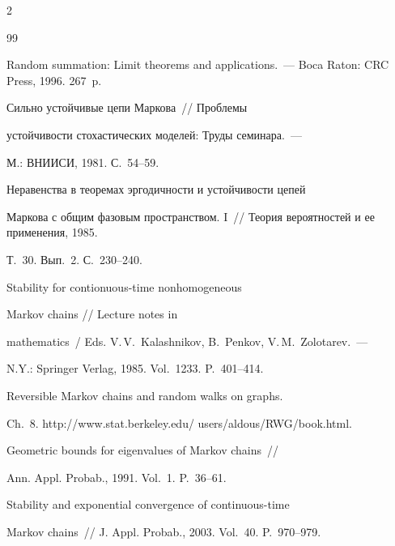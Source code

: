 \begin{multicols}{2}
{{\begin{thebibliography}{99}


Random summation: Limit theorems and applications.~--- Boca Raton: CRC Press, 1996. 267~p.




 Сильно устойчивые цепи Маркова~// Проб\-ле\-мы

устой\-чи\-вости сто\-ха\-сти\-че\-ских моделей: Труды семинара.~---

М.: ВНИИСИ, 1981. С.~54--59.




 Неравенства в теоремах эргодич\-ности и устойчивости цепей

Маркова с общим фазовым пространством. I~// Теория вероятностей и ее применения, 1985.

Т.~30. Вып.~2. С.~230--240.




  Stability for contionuous-time nonhomogeneous 

Markov chains //  Lecture notes in

mathematics~/ Eds. V.\,V.~Kalashnikov, B.~Penkov, V.\,M.~Zolotarev.~---

N.Y.: Springer Verlag,  1985. Vol.~1233. P.~401--414.




 Reversible Markov chains and random walks on graphs.

Ch.~8. {\sf http://www.stat.berkeley.edu/ users/aldous/RWG/book.html}. 




 Geometric bounds for eigenvalues of Markov chains~//

Ann. Appl. Probab., 1991. Vol.~1. P.~36--61.




  Stability and exponential convergence of continuous-time

Markov chains~// J. Appl. Probab., 2003. Vol.~40. P.~970--979.





\end{thebibliography}}}
\end{multicols}
